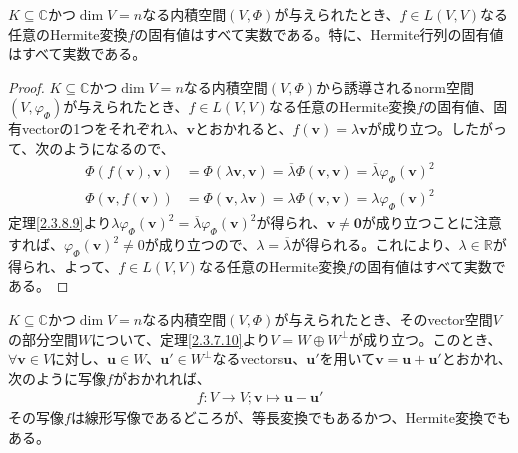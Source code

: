 \documentclass[dvipdfmx]{jsarticle}
\begin{document}
\begin{thm}\label{2.3.8.10}
$K \subseteq \mathbb{C}$かつ$\dim V = n$なる内積空間$(V,\varPhi)$が与えられたとき、$f \in L(V,V)$なる任意のHermite変換$f$の固有値はすべて実数である。特に、Hermite行列の固有値はすべて実数である。
\end{thm}
\begin{proof}
$K \subseteq \mathbb{C}$かつ$\dim V = n$なる内積空間$(V,\varPhi)$から誘導されるnorm空間$\left( V,\varphi_{\varPhi} \right)$が与えられたとき、$f \in L(V,V)$なる任意のHermite変換$f$の固有値、固有vectorの1つをそれぞれ$\lambda$、$\mathbf{v}$とおかれると、$f\left( \mathbf{v} \right) = \lambda\mathbf{v}$が成り立つ。したがって、次のようになるので、
\begin{align*}
\varPhi\left( f\left( \mathbf{v} \right),\mathbf{v} \right) &= \varPhi\left( \lambda\mathbf{v},\mathbf{v} \right) = \overline{\lambda}\varPhi\left( \mathbf{v},\mathbf{v} \right) = \overline{\lambda}{\varphi_{\varPhi}\left( \mathbf{v} \right)}^{2}\\
\varPhi\left( \mathbf{v},f\left( \mathbf{v} \right) \right) &= \varPhi\left( \mathbf{v},\lambda\mathbf{v} \right) = \lambda\varPhi\left( \mathbf{v},\mathbf{v} \right) = \lambda{\varphi_{\varPhi}\left( \mathbf{v} \right)}^{2}
\end{align*}
定理\ref{2.3.8.9}より$\lambda{\varphi_{\varPhi}\left( \mathbf{v} \right)}^{2} = \overline{\lambda}{\varphi_{\varPhi}\left( \mathbf{v} \right)}^{2}$が得られ、$\mathbf{v} \neq \mathbf{0}$が成り立つことに注意すれば、${\varphi_{\varPhi}\left( \mathbf{v} \right)}^{2} \neq 0$が成り立つので、$\lambda = \overline{\lambda}$が得られる。これにより、$\lambda \in \mathbb{R}$が得られ、よって、$f \in L(V,V)$なる任意のHermite変換$f$の固有値はすべて実数である。
\end{proof}
\begin{thm}\label{2.3.8.11}
$K \subseteq \mathbb{C}$かつ$\dim V = n$なる内積空間$(V,\varPhi)$が与えられたとき、そのvector空間$V$の部分空間$W$について、定理\ref{2.3.7.10}より$V = W \oplus W^{\bot}$が成り立つ。このとき、$\forall\mathbf{v} \in V$に対し、$\mathbf{u} \in W$、$\mathbf{u}' \in W^{\bot}$なるvectors$\mathbf{u}$、$\mathbf{u}'$を用いて$\mathbf{v} = \mathbf{u} + \mathbf{u}'$とおかれ、次のように写像$f$がおかれれば、
\begin{align*}
f:V \rightarrow V;\mathbf{v} \mapsto \mathbf{u} - \mathbf{u}'
\end{align*}
その写像$f$は線形写像であるどころが、等長変換でもあるかつ、Hermite変換でもある。
\end{thm}
\end{document}
